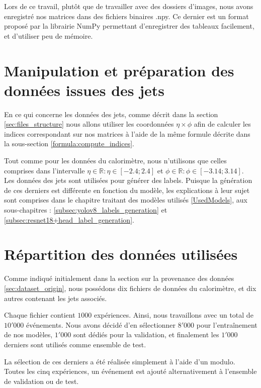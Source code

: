 Lors de ce travail, plutôt que de travailler avec des dossiers d'images, nous avons enregistré nos matrices dans des fichiers binaires .npy. Ce dernier est un format proposé par la librairie NumPy permettant d'enregistrer des tableaux facilement, et d'utiliser peu de mémoire.


\section{Manipulation et préparation des données issues des jets}

En ce qui concerne les données des jets, comme décrit dans la section \ref{sec:files_structure} nous allons utiliser les coordonnées $\eta \times \phi$ afin de calculer les indices correspondant sur nos matrices à l'aide de la même formule décrite dans la sous-section \ref{formula:compute_indices}.

Tout comme pour les données du calorimètre, nous n'utilisons que celles comprises dans l'intervalle $\eta \in \mathbb{R} : \eta \in [-2.4;2.4]$ et $\phi \in \mathbb{R} : \phi \in [-3.14;3.14]$.\\

Les données des jets sont utilisées pour générer des labels. Puisque la génération de ces derniers est différente en fonction du modèle, les explications à leur sujet sont comprises dans le chapitre traitant des modèles utilisés \ref{UsedModels}, aux sous-chapitres : \ref{subsec:yolov8_labels_generation} et \ref{subsec:resnet18+head_label_generation}.

\section{Répartition des données utilisées}

Comme indiqué initialement dans la section sur la provenance des données \ref{sec:dataset_origin}, nous possédons dix fichiers de données du calorimètre, et dix autres contenant les jets associés.

Chaque fichier contient $1000$ expériences. Ainsi, nous travaillons avec un total de $10'000$ événements. Nous avons décidé d'en sélectionner $8'000$ pour l'entraînement de nos modèles, $1'000$ sont dédiés pour la validation, et finalement les $1'000$ derniers sont utilisés comme ensemble de test. 

La sélection de ces derniers a été réalisée simplement à l'aide d'un modulo. Toutes les cinq expériences, un événement est ajouté alternativement à l'ensemble de validation ou de test.

